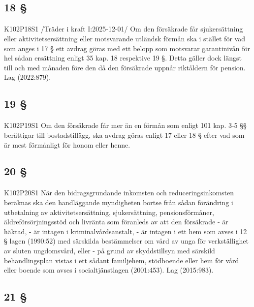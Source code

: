\documentclass[a4paper,notitlepage,openany,10pt]{book}
\begin{document}
\subsection*{18 §}
\paragraph*{}
{\tiny K102P18S1}
/Träder i kraft I:2025-12-01/
Om den försäkrade får sjukersättning eller aktivitetsersättning eller motsvarande utländsk förmån ska i stället för vad som anges i 17 § ett avdrag göras med ett belopp som motsvarar garantinivån för hel sådan ersättning enligt 35 kap. 18 respektive 19 §. Detta gäller dock längst till och med månaden före den då den försäkrade uppnår riktåldern för pension.
Lag (2022:879).
\subsection*{19 §}
\paragraph*{}
{\tiny K102P19S1}
Om den försäkrade får mer än en förmån som enligt 101 kap. 3-5 §§ berättigar till bostadstillägg, ska avdrag göras enligt 17 eller 18 § efter vad som är mest förmånligt för honom eller henne.
\subsection*{20 §}
\paragraph*{}
{\tiny K102P20S1}
När den bidragsgrundande inkomsten och reduceringsinkomsten beräknas ska den handläggande myndigheten bortse från sådan förändring i utbetalning av aktivitetsersättning, sjukersättning, pensionsförmåner, äldreförsörjningsstöd och livränta som föranleds av att den försäkrade
\newline - är häktad,
\newline - är intagen i kriminalvårdsanstalt,
\newline - är intagen i ett hem som avses i 12 § lagen (1990:52) med särskilda bestämmelser om vård av unga för verkställighet av sluten ungdomsvård, eller
\newline - på grund av skyddstillsyn med särskild behandlingsplan vistas i ett sådant familjehem, stödboende eller hem för vård eller boende som avses i socialtjänstlagen (2001:453).
Lag (2015:983).
\subsection*{21 §}
\end{document}
